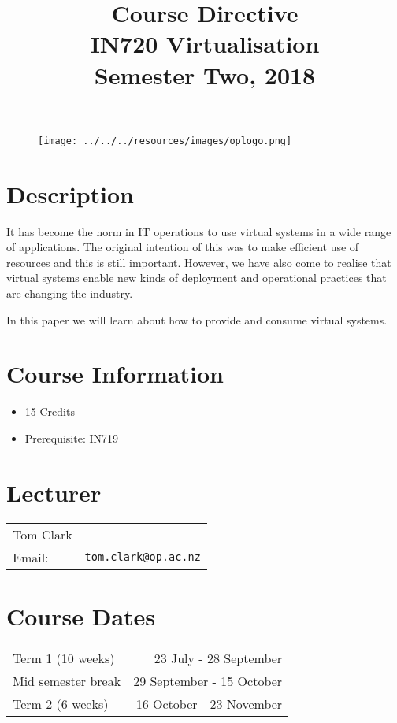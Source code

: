 \documentclass{article}
\begin{document}
\begin{figure}
\texttt{[image: ../../../resources/images/oplogo.png]}
\end{figure}

\title{Course Directive\\IN720 Virtualisation\\Semester Two, 2018}
\date{}
\maketitle

\section*{Description}
It has become the norm in IT operations to use virtual systems in a wide range of applications.  The original intention of this was to make efficient use of resources and this is still important.  However, we have also come to realise that virtual systems enable new kinds of deployment and operational practices that are changing the industry.

In this paper we will learn about how to provide and consume virtual systems.

\section*{Course Information}
\begin{itemize}
  \item 15 Credits
  \item Prerequisite: IN719
\end{itemize}

\section*{Lecturer}
\begin{tabular}{lr}

  Tom Clark &    \\
     Email: & \texttt{tom.clark@op.ac.nz} \\
\end{tabular}

\section*{Course Dates}
\begin{tabular}{lr}
Term 1 (10 weeks) & 23 July - 28 September \\
Mid semester break & 29 September - 15 October \\
Term 2 (6 weeks) & 16 October - 23 November \\
\end{tabular}
\end{document}
